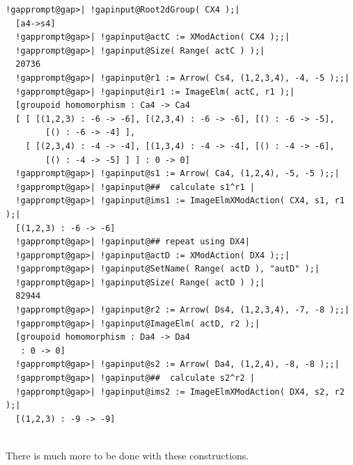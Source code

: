 \documentclass[a4paper,11pt]{report}
\begin{document}
{{\begin{Verbatim}[commandchars=!@|,fontsize=\small,frame=single,label=Example]
  !gapprompt@gap>| !gapinput@Root2dGroup( CX4 );|
  [a4->s4]
  !gapprompt@gap>| !gapinput@actC := XModAction( CX4 );;|
  !gapprompt@gap>| !gapinput@Size( Range( actC ) );|
  20736
  !gapprompt@gap>| !gapinput@r1 := Arrow( Cs4, (1,2,3,4), -4, -5 );;|
  !gapprompt@gap>| !gapinput@ir1 := ImageElm( actC, r1 );|
  [groupoid homomorphism : Ca4 -> Ca4
  [ [ [(1,2,3) : -6 -> -6], [(2,3,4) : -6 -> -6], [() : -6 -> -5], 
        [() : -6 -> -4] ], 
    [ [(2,3,4) : -4 -> -4], [(1,3,4) : -4 -> -4], [() : -4 -> -6], 
        [() : -4 -> -5] ] ] : 0 -> 0]
  !gapprompt@gap>| !gapinput@s1 := Arrow( Ca4, (1,2,4), -5, -5 );;|
  !gapprompt@gap>| !gapinput@##  calculate s1^r1 |
  !gapprompt@gap>| !gapinput@ims1 := ImageElmXModAction( CX4, s1, r1 );|
  [(1,2,3) : -6 -> -6]
  !gapprompt@gap>| !gapinput@## repeat using DX4|
  !gapprompt@gap>| !gapinput@actD := XModAction( DX4 );;|
  !gapprompt@gap>| !gapinput@SetName( Range( actD ), "autD" );|
  !gapprompt@gap>| !gapinput@Size( Range( actD ) );|
  82944
  !gapprompt@gap>| !gapinput@r2 := Arrow( Ds4, (1,2,3,4), -7, -8 );;|
  !gapprompt@gap>| !gapinput@ImageElm( actD, r2 );|
  [groupoid homomorphism : Da4 -> Da4
   : 0 -> 0]
  !gapprompt@gap>| !gapinput@s2 := Arrow( Da4, (1,2,4), -8, -8 );;|
  !gapprompt@gap>| !gapinput@##  calculate s2^r2 |
  !gapprompt@gap>| !gapinput@ims2 := ImageElmXModAction( DX4, s2, r2 );|
  [(1,2,3) : -9 -> -9]
  
\end{Verbatim}
 There is much more to be done with these constructions. }

 }

         
\end{document}
